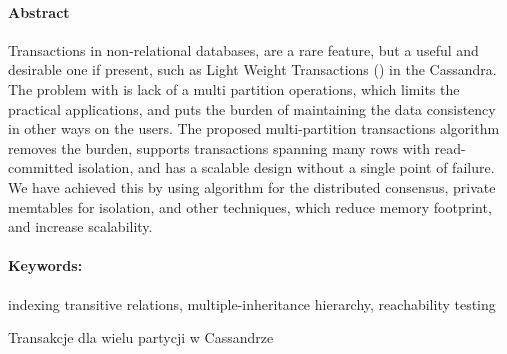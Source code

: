 \newpage
\paragraph{Abstract} 
Transactions in non-relational databases, are a rare feature, but a useful and desirable one if present, such as Light Weight Transactions (\lwt) in the Cassandra.
The problem with \lwt is lack of a multi partition operations, which limits the practical applications, and puts the burden of maintaining the data consistency in other ways on the users.
The proposed multi-partition transactions algorithm removes the burden, supports transactions spanning many rows with read-committed isolation, and has a scalable design without a single point of failure.
We have achieved this by using \paxos algorithm for the distributed consensus, private memtables for isolation, and other techniques, which reduce memory footprint, and increase scalability.



\paragraph{Keywords:} indexing transitive relations, multiple-inheritance hierarchy, reachability testing

\begin{center}
\vspace*{\baselineskip}
    \fontsize{15pt}{18pt}\selectfont
      Transakcje dla wielu partycji w Cassandrze  \\
\end{center}
